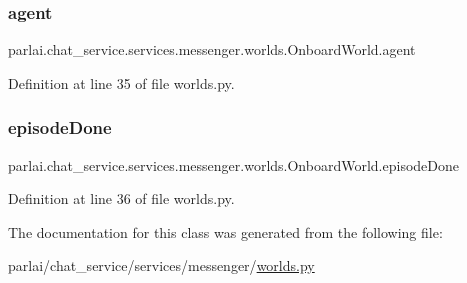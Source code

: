 \subsubsection{\texorpdfstring{agent}{agent}}
{\footnotesize\ttfamily parlai.\+chat\+\_\+service.\+services.\+messenger.\+worlds.\+Onboard\+World.\+agent}



Definition at line 35 of file worlds.\+py.

\mbox{\label{classparlai_1_1chat__service_1_1services_1_1messenger_1_1worlds_1_1OnboardWorld_ac6edc33667eb01803fb1eb88a769a0de}} 
\subsubsection{\texorpdfstring{episode\+Done}{episodeDone}}
{\footnotesize\ttfamily parlai.\+chat\+\_\+service.\+services.\+messenger.\+worlds.\+Onboard\+World.\+episode\+Done}



Definition at line 36 of file worlds.\+py.



The documentation for this class was generated from the following file\+:\begin{DoxyCompactItemize}
\item 
parlai/chat\+\_\+service/services/messenger/\hyperlink{parlai_2chat__service_2services_2messenger_2worlds_8py}{worlds.\+py}\end{DoxyCompactItemize}
